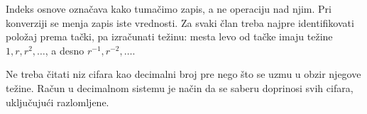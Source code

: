 
Indeks osnove označava kako tumačimo zapis, a ne operaciju nad njim. Pri konverziji se menja zapis iste vrednosti. Za svaki član treba najpre identifikovati položaj prema tački, pa izračunati težinu: mesta levo od tačke imaju težine $1,r,r^2,\ldots$, a desno $r^{-1},r^{-2},\ldots$.

Ne treba čitati niz cifara kao decimalni broj pre nego što se uzmu u obzir njegove težine. Račun u decimalnom sistemu je način da se saberu doprinosi svih cifara, uključujući razlomljene.
